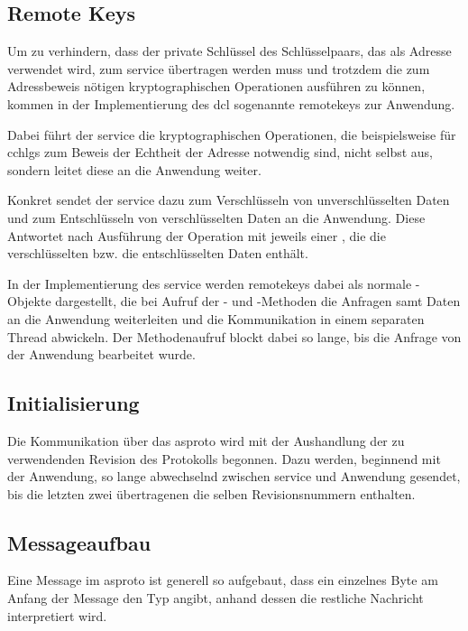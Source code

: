 \subsection{Remote Keys}
\label{dcl-asproto-remotekeys}
Um zu verhindern, dass der private Schlüssel des Schlüsselpaars, das als Adresse
verwendet wird, zum \gls{service} übertragen werden muss und trotzdem die zum
Adressbeweis nötigen kryptographischen Operationen ausführen zu können, kommen
in der Implementierung des \gls{dcl} sogenannte \glspl{remotekey} zur Anwendung.

Dabei führt der \gls{service} die kryptographischen Operationen, die
beispielsweise für \glspl{cchlg} zum Beweis der Echtheit der Adresse notwendig
sind, nicht selbst aus, sondern leitet diese an die Anwendung weiter.

Konkret sendet der \gls{service} dazu \msgpl{\asprotokeyenc} zum Verschlüsseln
von unverschlüsselten Daten und \msgpl{\asprotokeydec} zum Entschlüsseln von
verschlüsselten Daten an die Anwendung. Diese Antwortet nach Ausführung der
Operation mit jeweils einer \msg{\asprotocryptoresponse}, die die
verschlüsselten bzw. die entschlüsselten Daten enthält.

In der Implementierung des \gls{service} werden \glspl{remotekey} dabei als
normale -Objekte dargestellt, die bei Aufruf der - und
-Methoden die Anfragen samt Daten an die Anwendung weiterleiten
und die Kommunikation in einem separaten Thread abwickeln.
Der Methodenaufruf blockt dabei so lange, bis die Anfrage von der Anwendung
bearbeitet wurde.

\subsection{Initialisierung}
Die Kommunikation über das \gls{asproto} wird mit der Aushandlung der zu
verwendenden Revision des Protokolls begonnen.
Dazu werden, beginnend mit der Anwendung, so lange \msgpl{\asprotorevision}
abwechselnd zwischen \gls{service} und Anwendung gesendet, bis die letzten
zwei übertragenen \msgpl{\asprotorevision} die selben Revisionsnummern
enthalten.

\subsection{Messageaufbau}
Eine Message im \gls{asproto} ist generell so aufgebaut, dass ein einzelnes Byte
am Anfang der Message den Typ angibt, anhand dessen die restliche Nachricht
interpretiert wird.

